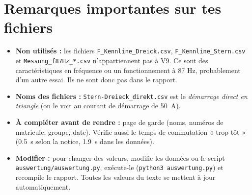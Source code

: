 \documentclass[11pt,a4paper]{article}
\begin{document}
\section{Remarques importantes sur tes fichiers}
\begin{itemize}
\item \textbf{Non utilisés :} les fichiers \texttt{F\_Kennline\_Dreick.csv},
  \texttt{F\_Kennline\_Stern.csv} et \texttt{Messung\_f87Hz\_*.csv} n'appartiennent pas à V9.
  Ce sont des caractéristiques en fréquence ou un fonctionnement à 87 Hz, probablement d'un
  autre essai. Ils ne sont donc pas dans le rapport.
\item \textbf{Noms des fichiers :} \texttt{Stern-Dreieck\_direkt.csv} est le
  \emph{démarrage direct en triangle} (on le voit au courant de démarrage de \SI{50}{A}).
\item \textbf{À compléter avant de rendre :} page de garde (noms, numéros de matricule, groupe,
  date). Vérifie aussi le temps de commutation « trop tôt » (\SI{0,5}{s} selon la notice,
  \SI{1,9}{s} dans les données).
\item \textbf{Modifier :} pour changer des valeurs, modifie les données ou le script
  \texttt{auswertung/auswertung.py}, exécute-le (\texttt{python3 auswertung.py}) et recompile
  le rapport. Toutes les valeurs du texte se mettent à jour automatiquement.
\end{itemize}
\end{document}
